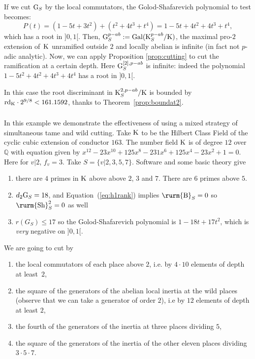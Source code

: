 \documentclass[12pt,a4paper,twoside,english]{smfart}
\def\Q{{\mathbb Q}}
\def\sha{{{\textnormal{\rurm{Sh}}}}}
\def\CyB{{{\textnormal{\rurm{B}}}}}
\def\G{{\rm G}}
\def\K{{\rm K}}
\def\rd{{\rm rd}}
\def\Gal{{\rm Gal}}
\begin{document}
 If we cut $\G_S$ by the local commutators, the Golod-Shafarevich polynomial to test becomes:
 $$P(t)=(1-5t+3t^2 ) +(t^2+4t^3+t^4) =   1-5t+4t^2+4t^3+t^4,$$
 which has a root in  $]0,1[$.
Then,  $\G_{S}^{p-ab}:=\Gal(\K_{S}^{p-ab}/\K)$, the maximal pro-$2$ extension of~$\K$ unramified outside $2$ and locally abelian is infinite 
(in fact not $p$-adic analytic).
Now, we can apply Proposition \ref{prop:cutting} to cut the ramification at a certain depth. Here   $\G_S^{[2],p-ab}$ is
 infinite: indeed  the polynomial  $1-5t^2+4t^2+4t^3+4t^4$ has a root in $]0,1[$.
 
 In this case the root discriminant in $ \K_{S}^{2,p-ab}/\K$ is bounded by 
 $\rd_\K \cdot 2^{9/8} <  161.1592  $,
 thanks to Theorem~\ref{prop:boundat2}.
 


\subsubsection{} In  this example we demonstrate the  effectiveness of using a mixed strategy of simultaneous tame and wild cutting.  Take $\K$ to be  the Hilbert Class  Field of the cyclic cubic extension of conductor $163$. The number field $\K$ is of degree $12$
 over~$\Q$ with equation given by $x^{12} - 23 x^{10} + 125x^8 - 231x^6 + 125x^4 - 23x^2 + 1=0$.  Here for $v|2$, $f_v=3$.
 Take $S=\{v|2, 3, 5, 7\}$.  
 Software and some basic theory give
 \begin{enumerate}
  \item[$\bullet$] there are $4$ primes in $\K$ above above $2$, $3$ and $7$. There are $6$ primes above $5$.
  \item[$\bullet$]   $d_2 \G_S=18$, and  Equation~(\ref{eq:h1rank}) implies  $\CyB_S=0$ so $\sha^2_S=0$ as well
  \item[$\bullet$]  $r(G_S) \leq 17$ so the Golod-Shafarevich polynomial is $1-18t+17t^2$, which is {\it very} negative on $]0,1[$.
  \end{enumerate}
We are going to cut by
 \begin{enumerate}
  \item[$\bullet$] the local commutators of each place above $2$, i.e. by $4\cdot 10$ elements of depth at least~$2$,
  \item[$\bullet$] the square of the generators of the abelian local inertia at the wild places (observe that we can take a generator of order $2$), i.e by $12$ elements of depth 
  at least $2$,
  \item[$\bullet$] the fourth of the generators of the  inertia at three  places dividing $5$,
  \item[$\bullet$] the square of the generators of the inertia of the other eleven places dividing $3\cdot 5\cdot 7$.
 \end{enumerate}
 
\end{document}
